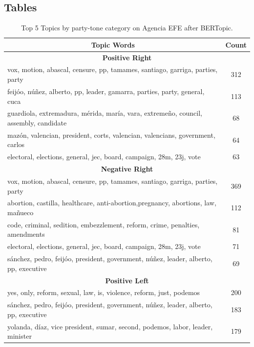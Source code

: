 \documentclass[12pt]{article}
\begin{document}
	\clearpage
	
	\subsection{Tables}
	
	
	
	
\begin{table}[h!]
	\centering
	\caption{Top 5 Topics by party-tone category on Agencia EFE after BERTopic. }
	\begin{tabular}{|l|c|}
		\hline
				\multicolumn{1}{|c|}{\textbf{Topic Words}}& \textbf{Count} \\
		\hline
		\hline
		\multicolumn{2}{|c|}{\textbf{Positive Right}} \\
		\hline
		vox, motion, abascal, censure, pp, tamames, santiago, garriga, parties, party & 312 \\
		feijóo, núñez, alberto, pp, leader, gamarra, parties, party, general, cuca & 113 \\
		guardiola, extremadura, mérida, maría, vara, extremeño, council, assembly, candidate & 68 \\
		mazón, valencian, president, corts, valencian, valencians, government, carlos & 64 \\
		electoral, elections, general, jec, board, campaign, 28m, 23j, vote & 63 \\
		\hline
		\multicolumn{2}{|c|}{\textbf{Negative Right}} \\
		\hline
		vox, motion, abascal, censure, pp, tamames, santiago, garriga, parties, party & 369 \\
		abortion, castilla, healthcare, anti-abortion,pregnancy, abortions, law, mañueco & 112 \\
		code, criminal, sedition, embezzlement, reform, crime, penalties, amendments & 81 \\
		electoral, elections, general, jec, board, campaign, 28m, 23j, vote & 71 \\
		sánchez, pedro, feijóo, president, government, núñez, leader, alberto, pp, executive & 69 \\
		\hline
		\multicolumn{2}{|c|}{\textbf{Positive Left}} \\
		\hline
		yes, only, reform, sexual, law, is, violence, reform, just, podemos & 200 \\
		sánchez, pedro, feijóo, president, government, núñez, leader, alberto, pp, executive & 183 \\
		yolanda, díaz, vice president, sumar, second, podemos, labor, leader, minister & 179 \\

\end{tabular}
\end{table}
\end{document}
